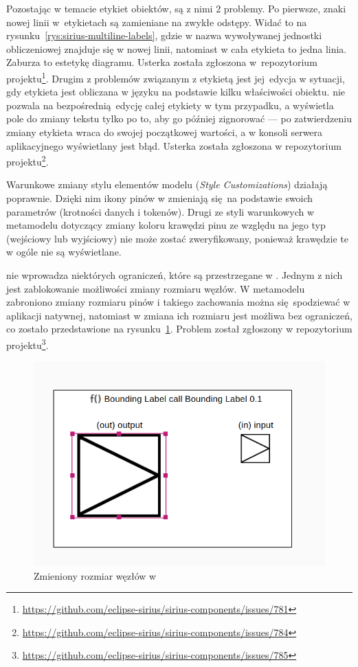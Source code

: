 Pozostając w temacie etykiet obiektów, są z nimi 2 problemy. Po pierwsze,
znaki nowej linii w~etykietach są zamieniane na zwykłe odstępy. Widać to na
rysunku~\ref{rys:sirius-multiline-labels}, gdzie w \SiriusDesktop{} nazwa
wywoływanej jednostki
obliczeniowej znajduje się w nowej linii, natomiast w \SiriusWeb{} cała
etykieta to jedna linia. Zaburza to estetykę diagramu. Usterka została
zgłoszona w~repozytorium projektu\footnote{
	\url{https://github.com/eclipse-sirius/sirius-components/issues/781}
}. Drugim z problemów związanym z etykietą jest jej~edycja w sytuacji, gdy
etykieta jest obliczana w języku \AQL{} na podstawie kilku właściwości
obiektu. \SiriusDesktop{} nie pozwala na bezpośrednią edycję całej
etykiety w tym przypadku, a \SiriusWeb{} wyświetla pole do zmiany tekstu
tylko po to, aby go później zignorować --- po zatwierdzeniu zmiany etykieta
wraca do swojej początkowej wartości, a w konsoli serwera aplikacyjnego
wyświetlany jest błąd. Usterka została zgłoszona w repozytorium
projektu\footnote{
	\url{https://github.com/eclipse-sirius/sirius-components/issues/784}
}.

Warunkowe zmiany stylu elementów modelu (\emph{Style Customizations}) działają
poprawnie. Dzięki nim ikony pinów w \SiriusWeb{} zmieniają się na
podstawie swoich parametrów (krotności danych i tokenów). Drugi ze styli
warunkowych w metamodelu dotyczący zmiany koloru krawędzi pinu ze względu na
jego typ (wejściowy lub wyjściowy) nie może zostać zweryfikowany, ponieważ
krawędzie te w ogóle nie są wyświetlane.

\SiriusWeb{} nie wprowadza niektórych ograniczeń, które są przestrzegane w
\SiriusDesktop{}. Jednym z nich jest zablokowanie możliwości zmiany
rozmiaru węzłów. W metamodelu zabroniono zmiany rozmiaru pinów i takiego
zachowania można się spodziewać w aplikacji natywnej, natomiast w \SiriusWeb{}
zmiana ich rozmiaru jest możliwa bez ograniczeń, co zostało
przedstawione na
rysunku~\ref{rys:change-node-size}. Problem został zgłoszony w repozytorium
projektu\footnote{
	\url{https://github.com/eclipse-sirius/sirius-components/issues/785}}.

\begin{figure}[!hb]
  \centering

  \includegraphics[width=0.6\linewidth]{./images/change-node-size.png}
  \caption{Zmieniony rozmiar węzłów w \SiriusWeb{}}\label{rys:change-node-size}
\end{figure}

